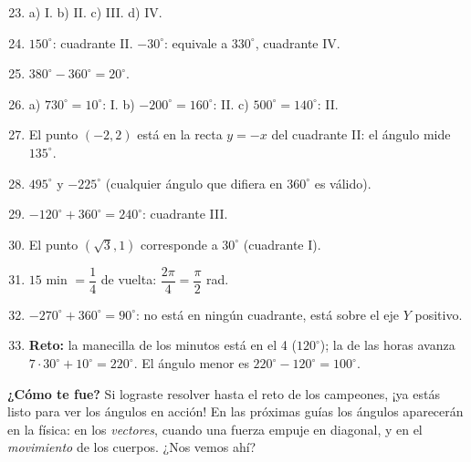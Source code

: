 \documentclass[12pt, letterpaper]{article}
\begin{document}
  \begin{enumerate}[leftmargin=*, label=\textbf{\arabic*.}]
    \setcounter{enumi}{22}
    \item a) I. \quad b) II. \quad c) III. \quad d) IV.
    \item $150^{\circ}$: cuadrante II. $-30^{\circ}$: equivale a $330^{\circ}$, cuadrante IV.
    \item $380^{\circ} - 360^{\circ} = 20^{\circ}$.
    \item a) $730^{\circ} = 10^{\circ}$: I. \quad b) $-200^{\circ} = 160^{\circ}$: II. \quad c) $500^{\circ} = 140^{\circ}$: II.
    \item El punto $(-2, 2)$ está en la recta $y = -x$ del cuadrante II: el ángulo mide $135^{\circ}$.
    \item $495^{\circ}$ y $-225^{\circ}$ (cualquier ángulo que difiera en $360^{\circ}$ es válido).
    \item $-120^{\circ} + 360^{\circ} = 240^{\circ}$: cuadrante III.
    \item El punto $(\sqrt{3}, 1)$ corresponde a $30^{\circ}$ (cuadrante I).
    \item $15$ min $= \dfrac{1}{4}$ de vuelta: $\dfrac{2\pi}{4} = \dfrac{\pi}{2}$ rad.
    \item $-270^{\circ} + 360^{\circ} = 90^{\circ}$: no está en ningún cuadrante, está sobre el eje $Y$ positivo.
    \item \textbf{Reto:} la manecilla de los minutos está en el 4 ($120^{\circ}$); la de las horas avanza $7 \cdot 30^{\circ} + 10^{\circ} = 220^{\circ}$. El ángulo menor es $220^{\circ} - 120^{\circ} = 100^{\circ}$.
  \end{enumerate}

  \vspace{8pt}
  \begin{cuadroinfo}
    \small
    \textbf{¿Cómo te fue?} Si lograste resolver hasta el reto de los campeones, ¡ya estás listo para ver los ángulos en acción! En las próximas guías los ángulos aparecerán en la física: en los \emph{vectores}, cuando una fuerza empuje en diagonal, y en el \emph{movimiento} de los cuerpos. ¿Nos vemos ahí?
  \end{cuadroinfo}

\fi
\end{document}
